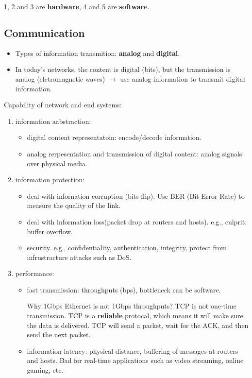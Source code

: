 \documentclass{../../ainote}
\begin{document}
\begin{info}
    1, 2 and 3 are \textbf{hardware}, 4 and 5 are \textbf{software}.
\end{info}

\subsection{Communication}
\begin{itemize}[leftmargin=*]
    \item Types of information transmition: \textbf{analog} and \textbf{digital}.
    \item In today's networks, the content is digital (bits), but the transmission is analog (eletromagnetic waves) $\rightarrow$ use analog information to transmit digital information.
\end{itemize}

Capability of network and end systems:
\begin{enumerate}
    \item information aabstraction:
        \begin{itemize}
            \item digital content representatoin: encode/decode information.
            \item analog rerpesentation and transmission of digital content: analog signals over physical media.
        \end{itemize}
    \item information protection:
        \begin{itemize}
            \item deal with infornation corruption (bits flip). Use BER (Bit Error Rate) to measure the quality of the link.
            \item deal with information loss(packet drop at routers and hosts). e.g., culprit: buffer overflow.
            \item security. e.g., confidentiality, authentication, integrity, protect from infrustracture attacks such as DoS.
        \end{itemize}
    \item performance:
        \begin{itemize}
            \item fast transmission: throughputs (bps), bottleneck can be software. 
            
            Why 1Gbps Ethernet is not 1Gbps throughputs? TCP is not one-time transmission. TCP is a \textbf{reliable} protocal, which means it will make sure the data is delivered. TCP will send a packet, wait for the ACK, and then send the next packet.

            \item information latency: physical distance, buffering of messages at routers and hosts. Bad for real-time applications such as video streaming, online gaming, etc.
        \end{itemize}
\end{enumerate}
\end{document}
